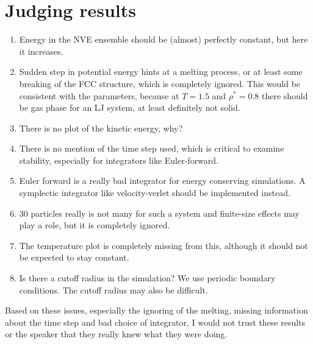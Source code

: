 \documentclass[11pt]{article}
\begin{document}
\section{Judging results}

\begin{enumerate}[wide]
	\item Energy in the NVE ensemble should be (almost) perfectly constant, but here it increases.
	\item Sudden step in potential energy hints at a melting process, or at least some breaking of the FCC structure, which is completely ignored. This would be consistent with the parameters, because at $T  = 1.5$ and $\rho^* = 0.8$ there should be gas phase for an LJ system, at least definitely not solid.
	\item There is no plot of the kinetic energy, why?
	\item There is no mention of the time step used, which is critical to examine stability, especially for integrators like Euler-forward.
	\item Euler forward is a really bad integrator for energy conserving simulations. A symplectic integrator like velocity-verlet should be implemented instead.
	\item 30 particles really is not many for such a system and finite-size effects may play a role, but it is completely ignored.
	\item The temperature plot is completely missing from this, although it should not be expected to stay constant.
	\item Is there a cutoff radius in the simulation? We use periodic boundary conditions. The cutoff radius may also be difficult.
\end{enumerate}

Based on these issues, especially the ignoring of the melting, missing information about the time step and bad choice of integrator, I would not trust these results or the speaker that they really knew what they were doing.
\end{document}
